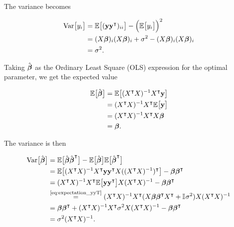 The variance becomes

\begin{align*}
    \variance{y_i} &= \EE{(\vec{y}\vec{y}\TT)_{ii}} -\Big(\EE{y_i}\Big)^2\\
    &= \Xbi \Xbi + \sigma^2 - \Xbi \Xbi\\
    &= \sigma^2.
\end{align*}


Taking $\optbeta$ as the Ordinary Least Square (OLS) expression for the optimal parameter, we get the expected value

\begin{align*}
    \EE{\optbeta} &= \EE{\invhessian X\TT \vec{y}} \\
    &= \invhessian X\TT \EE{\vec{y}} \\
    &= \invhessian \hessian \svec{\beta} \\
    &= \svec{\beta}.
\end{align*}

The variance is then 

\begin{align*}
    \variance{\optbeta} &= \EE{\optbeta \optbeta\TT} -\EE{\optbeta} \EE{\optbeta\TT} \\
    &= \EE{\invhessian X\TT  \vec{y} \vec{y}\TT X (\invhessian)\TT} - \svec{\beta} \svec{\beta}\TT \\
    &= \invhessian X\TT \EE{ \vec{y} \vec{y}\TT } X \invhessian - \svec{\beta} \svec{\beta}\TT \\
    &\stackrel{\text{\eqref{eq:expectation_yyT}}}{=}\invhessian X\TT ( X\svec{\beta} \svec{\beta}\TT X\TT+ \II\sigma^2) X \invhessian \\
    &= \svec{\beta} \svec{\beta} \TT + \invhessian X\TT \sigma^2 X \invhessian - \svec{\beta} \svec{\beta} \TT \\
    &= \sigma^2 \invhessian.
\end{align*}


